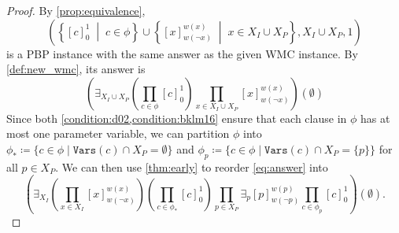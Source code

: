 \documentclass[runningheads]{llncs}
\begin{document}
\begin{proof}
  By \cref{prop:equivalence},
  \begin{equation}
    \left(\left\{[c]_0^1 \;\middle|\; c \in \phi\right\} \cup \left\{[x]_{w(\neg
          x)}^{w(x)} \;\middle|\; x \in X_I \cup X_P\right\}, X_I \cup X_P,
      1\right) \label{eq:new_wmc2}
  \end{equation}
  is a PBP instance with the same answer as the given WMC instance. By
  \cref{def:new_wmc}, its answer is
  \begin{equation} \label{eq:answer}
    \left(\exists_{X_I \cup X_P} \left( \prod_{c \in \phi} [c]_0^1 \right) \prod_{x \in X_I \cup X_P} [x]_{w(\neg x)}^{w(x)} \right)(\emptyset)
  \end{equation}
  Since both \cref{condition:d02,condition:bklm16} ensure that each clause in
  $\phi$ has at most one parameter variable, we can partition $\phi$ into
  $\phi_* \coloneqq \{c \in \phi \mid \mathtt{Vars}(c) \cap X_P = \emptyset \}$
  and $\phi_p \coloneqq \{ c \in \phi \mid \mathtt{Vars}(c) \cap X_P = \{ p \}
  \}$ for all $p \in X_P$. We can then use \cref{thm:early} to reorder
  \eqref{eq:answer} into
  \[
    \left(\exists_{X_I} \left( \prod_{x \in X_I} [x]_{w(\neg x)}^{w(x)} \right)
      \left( \prod_{c \in \phi_*} [c]_0^1 \right) \prod_{p \in X_P} \exists_p
      [p]_{w(\neg p)}^{w(p)} \prod_{c \in \phi_p} [c]_0^1 \right)(\emptyset).
  \]


\end{proof}
\end{document}
